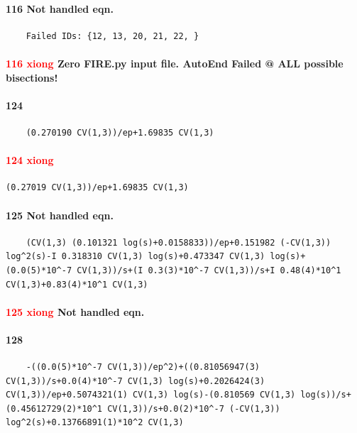 \documentclass{article}
\newcommand{\WN}[1]{\textcolor{RawSienna}{#1}}
\newcommand{\WNZF}{\WN{Zero FIRE.py input file. }}
\newcommand{\WNNH}{\WN{Not handled eqn. }}
\begin{document}
\paragraph{116	\WNNH}
\begin{verbatim}
	Failed IDs: {12, 13, 20, 21, 22, }
\end{verbatim}
\paragraph{\textcolor{red}{116 xiong}	\WNZF AutoEnd Failed @ ALL possible bisections!}

\paragraph{124}
\begin{verbatim}
	(0.270190 CV(1,3))/ep+1.69835 CV(1,3)
\end{verbatim}
\paragraph{\textcolor{red}{124 xiong}}
\begin{verbatim}
(0.27019 CV(1,3))/ep+1.69835 CV(1,3)
\end{verbatim}
\paragraph{125	\WNNH}
\begin{verbatim}
	(CV(1,3) (0.101321 log(s)+0.0158833))/ep+0.151982 (-CV(1,3)) log^2(s)-I 0.318310 CV(1,3) log(s)+0.473347 CV(1,3) log(s)+(0.0(5)*10^-7 CV(1,3))/s+(I 0.3(3)*10^-7 CV(1,3))/s+I 0.48(4)*10^1 CV(1,3)+0.83(4)*10^1 CV(1,3)
\end{verbatim}
\paragraph{\textcolor{red}{125 xiong} \WNNH}
\paragraph{128}
\begin{verbatim}
	-((0.0(5)*10^-7 CV(1,3))/ep^2)+((0.81056947(3) CV(1,3))/s+0.0(4)*10^-7 CV(1,3) log(s)+0.2026424(3) CV(1,3))/ep+0.5074321(1) CV(1,3) log(s)-(0.810569 CV(1,3) log(s))/s+(0.45612729(2)*10^1 CV(1,3))/s+0.0(2)*10^-7 (-CV(1,3)) log^2(s)+0.13766891(1)*10^2 CV(1,3)
\end{verbatim}
\end{document}
